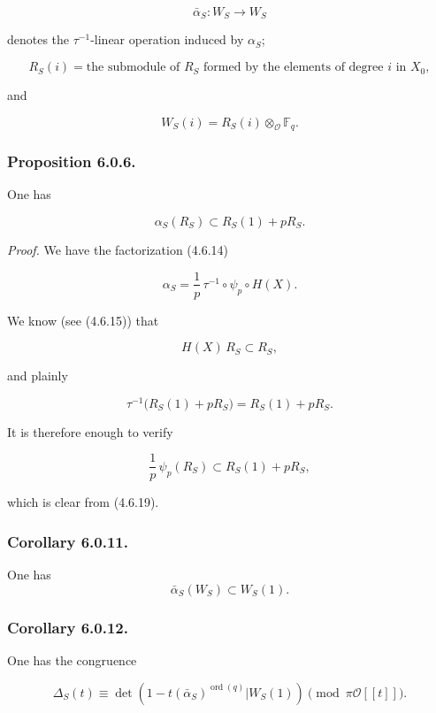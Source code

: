 \begin{equation}\tag{6.0.3}
\bar\alpha_S:W_S\longrightarrow W_S
\end{equation}

\noindent
denotes the $\tau^{-1}$-linear operation induced by $\alpha_S$;

\begin{equation}\tag{6.0.4}
R_S(i)
=\text{the submodule of $R_S$ formed by the elements of degree $i$ in $X_0$},
\end{equation}

and

\begin{equation}\tag{6.0.5}
W_S(i)=R_S(i)\otimes_{\mathcal O}\mathbb F_q.
\end{equation}

\subsubsection*{Proposition 6.0.6.}
One has

\[
\alpha_S(R_S)\subset R_S(1)+pR_S.
\]

\noindent\emph{Proof.}
We have the factorization (4.6.14)

\begin{equation}\tag{6.0.7}
\alpha_S=\frac1p\,\tau^{-1}\circ\psi_p\circ H(X).
\end{equation}

We know (see (4.6.15)) that

\begin{equation}\tag{6.0.8}
H(X)\,R_S\subset R_S,
\end{equation}

and plainly

\begin{equation}\tag{6.0.9}
\tau^{-1}\bigl(R_S(1)+pR_S\bigr)=R_S(1)+pR_S.
\end{equation}

It is therefore enough to verify

\begin{equation}\tag{6.0.10}
\frac1p\,\psi_p(R_S)\subset R_S(1)+pR_S,
\end{equation}

which is clear from (4.6.19).

\subsubsection*{Corollary 6.0.11.}
One has
\[
\bar\alpha_S(W_S)\subset W_S(1).
\]

\subsubsection*{Corollary 6.0.12.}
One has the congruence

\[
\Delta_S(t)\equiv
\det\!\left(
1-t(\bar\alpha_S)^{\operatorname{ord}(q)}
\mathrel{\Big|}W_S(1)\right)
\pmod{\pi\mathcal O[[t]]}.
\]
